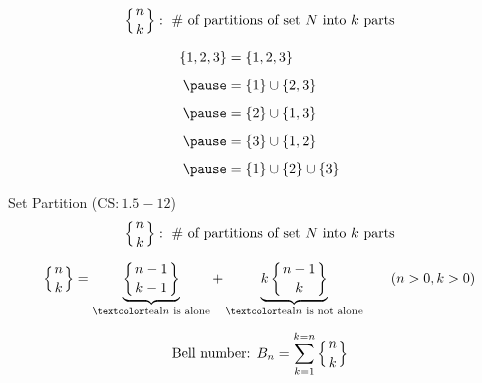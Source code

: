 
\begin{frame}{}
  \[
    \left\{ n \atop k \right\}: \text{ \# of partitions of set $N$ into $k$ parts}
  \]

  \begin{align*}
    \set{1, 2, 3} &= \set{1, 2, 3} \\[5pt] \pause
                  &= \set{1} \cup \set{2, 3}  \\[5pt] \pause
                  &= \set{2} \cup \set{1, 3}  \\[5pt] \pause
                  &= \set{3} \cup \set{1, 2}  \\[5pt] \pause
                  &= \set{1} \cup \set{2} \cup \set{3}
  \end{align*}

  \begin{center}
  \end{center}
\end{frame}

\begin{frame}{}
  \begin{exampleblock}{Set Partition ($\text{CS}: 1.5-12$)}
    \[
      \left\{ n \atop k \right\}: \text{ \# of partitions of set $N$ into $k$ parts}
    \]
  \end{exampleblock}

  \pause
  \vspace{0.60cm}
  \[
    \setpartition{n}{k} = \underbrace{\setpartition{n-1}{k-1}}_{\text{\teal{$n$ is alone}}} 
      + \underbrace{k \setpartition{n-1}{k}}_{\text{\teal{$n$ is not alone}}} \qquad (n > 0, k > 0)
  \]

  \pause
  \vspace{0.50cm}
  \[
    \text{Bell number: } B_n = \sum_{k=1}^{k=n} \left\{ n \atop k \right\}
  \]
\end{frame}

% 
% 
